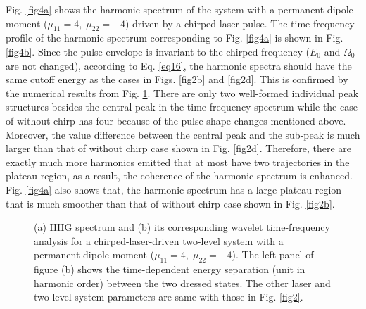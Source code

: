 \documentclass[10pt,letterpaper]{article}
\begin{document}
Fig. \ref{fig4a} shows the harmonic spectrum of the system with a permanent dipole moment ($\mu_{11}=4,\;\mu_{22}=-4$) driven by a chirped laser pulse. The time-frequency profile of the harmonic spectrum corresponding to Fig. \ref{fig4a} is shown in Fig. \ref{fig4b}. Since the pulse envelope is invariant to the chirped frequency ($E_{0}$ and $\Omega_0$ are not changed), according to Eq. \ref{eq16}, the harmonic spectra should have the same cutoff energy as the cases in Figs. \ref{fig2b} and \ref{fig2d}. This is confirmed by the numerical results from Fig. \ref{fig4}. There are only two well-formed individual peak structures besides the central peak in the time-frequency spectrum while the case of without chirp has four because of the pulse shape changes mentioned above. Moreover, the value difference between the central peak and the sub-peak is much larger than that of without chirp case shown in Fig. \ref{fig2d}. Therefore, there are exactly much more harmonics emitted that at most have two trajectories in the plateau region, as a result, the coherence of the harmonic spectrum is enhanced. Fig. \ref{fig4a} also shows that, the harmonic spectrum has a large plateau region that is much smoother than that of without chirp case shown in Fig. \ref{fig2b}.
\begin{figure}[!htbp]
	\centering
	\caption{(a) HHG spectrum and (b) its corresponding wavelet time-frequency analysis for a chirped-laser-driven two-level system with a permanent dipole moment ($\mu_{11}=4,\;\mu_{22}=-4$). The left panel of figure (b) shows the time-dependent energy separation (unit in harmonic order) between the two dressed states. The other laser and two-level system parameters are same with those in Fig. \ref{fig2}.}
	\label{fig4}
\end{figure}
\end{document}
